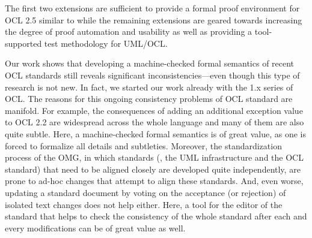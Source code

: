 The first two extensions are sufficient to provide a formal proof
environment for OCL 2.5 similar to \holocl while the remaining
extensions are geared towards increasing the degree of proof
automation and usability as well as providing a tool-supported test
methodology for {UML}/{OCL}.


Our work shows that developing a machine-checked formal semantics of
recent {OCL} standards still reveals significant
inconsistencies---even though this type of research is not new. In
fact, we started our work already with the 1.x series of
{OCL}. The reasons for this ongoing consistency problems of
{OCL} standard are manifold. For example, the consequences of
adding an additional exception value to OCL 2.2 are widespread across
the whole language and many of them are also quite subtle. Here, a
machine-checked formal semantics is of great value, as one is forced
to formalize all details and subtleties.  Moreover, the
standardization process of the {OMG}, in which standards (\eg, the
{UML} infrastructure and the {OCL} standard) that need to be
aligned closely are developed quite independently, are prone to ad-hoc
changes that attempt to align these standards. And, even worse,
updating a standard document by voting on the acceptance (or
rejection) of isolated text changes does not help either. Here, a tool
for the editor of the standard that helps to check the consistency of
the whole standard after each and every modifications can be of great
value as well.



